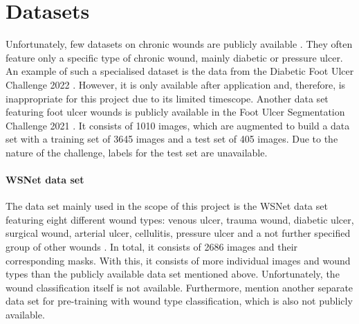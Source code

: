 \section{Datasets}

Unfortunately, few datasets on chronic wounds are publicly available \cite{Oota_2023_WACV}. They often feature only a specific type of chronic wound, mainly diabetic or pressure ulcer. An example of such a specialised dataset is the data from the Diabetic Foot Ulcer Challenge 2022 \cite{DFUC2022}. However, it is only available after application and, therefore, is inappropriate for this project due to its limited timescope. Another data set featuring foot ulcer wounds is publicly available in the Foot Ulcer Segmentation Challenge 2021 \cite{Wang2020}. It consists of 1010 images, which are augmented to build a data set with a training set of 3645 images and a test set of 405 images. Due to the nature of the challenge, labels for the test set are unavailable.

\paragraph{WSNet data set} The data set mainly used in the scope of this project is the WSNet data set featuring eight different wound types: venous ulcer, trauma wound, diabetic ulcer, surgical wound, arterial ulcer, cellulitis, pressure ulcer and a not further specified group of other wounds \cite{Oota_2023_WACV, Oota_2021_WACV}. In total, it consists of 2686 images and their corresponding masks. With this, it consists of more individual images and wound types than the publicly available data set mentioned above. Unfortunately, the wound classification itself is not available. Furthermore, \citeauthor{Oota_2023_WACV} mention another separate data set for pre-training with wound type classification, which is also not publicly available.
